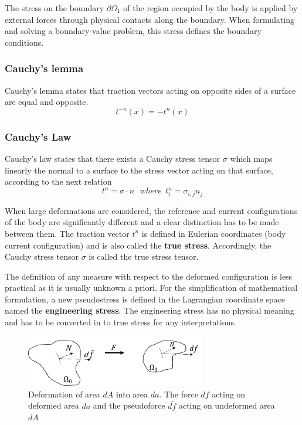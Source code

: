 The stress on the boundary $\partial \Omega_1$ of the region occupied by the body is applied by external forces through physical contacts along the boundary. When formulating and solving a boundary-value problem, this stress defines the boundary conditions.


\subsubsection*{Cauchy's lemma}

Cauchy's lemma states that traction vectors acting on opposite sides of a surface are equal and opposite.
\begin{equation}
t^{-n}(x) = -t^n(x)
\label{chauchyLemma}
\end{equation}
\subsubsection*{Cauchy's Law}
Cauchy’s law states that there exists a Cauchy stress tensor $\sigma$ which maps linearly the normal to a surface to the stress vector acting on that surface, according to the next relation
\begin{equation}
t^n = \sigma \cdot n \ \ \ where \  \ t^n_i = \sigma_{i,j} n_j
\end{equation}

When large deformations are considered, the reference and current configurations of the body are significantly different and a clear distinction has to be made between them. The traction vector $t^n$ is defined in Eulerian coordinates (body current configuration) and is also called the \textbf{true stress}. Accordingly, the Cauchy stress tensor $\sigma$ is called the true stress tensor.

The definition of any measure with respect to the deformed configuration is less practical as it is usually unknown a priori. For the simplification of mathematical formulation, a new pseudostress is defined in the Lagrangian coordinate space named the \textbf{engineering stress}. The engineering stress has no physical meaning and has to be converted in to true stress for any interpretations.


\begin{figure}
\begin{center}
\includegraphics[width=0.7\textwidth,keepaspectratio]{figures/stressnotion.png} 
\caption[]{Deformation of area $dA$  into area $da$. The force $df$ acting on deformed area $da$ and the pseudoforce $d\tilde{f}$ acting on undeformed area $dA$}
\label{stressnotion}
\end{center}
\end{figure} 



